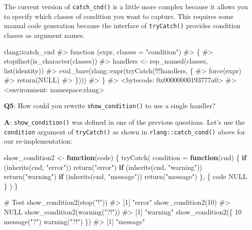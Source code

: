 \documentclass[
]{krantz}
\makeatletter
\newenvironment{Shaded}{\begin{snugshade}}{\end{snugshade}}
\newcommand{\CommentTok}[1]{\textcolor[rgb]{0.56,0.35,0.01}{\textit{#1}}}
\newcommand{\ControlFlowTok}[1]{\textcolor[rgb]{0.13,0.29,0.53}{\textbf{#1}}}
\newcommand{\DataTypeTok}[1]{\textcolor[rgb]{0.13,0.29,0.53}{#1}}
\newcommand{\DecValTok}[1]{\textcolor[rgb]{0.00,0.00,0.81}{#1}}
\newcommand{\KeywordTok}[1]{\textcolor[rgb]{0.13,0.29,0.53}{\textbf{#1}}}
\newcommand{\NormalTok}[1]{#1}
\newcommand{\OperatorTok}[1]{\textcolor[rgb]{0.81,0.36,0.00}{\textbf{#1}}}
\newcommand{\OtherTok}[1]{\textcolor[rgb]{0.56,0.35,0.01}{#1}}
\newcommand{\StringTok}[1]{\textcolor[rgb]{0.31,0.60,0.02}{#1}}
\newenvironment{kframe}{%
\medskip{}
\setlength{\fboxsep}{.8em}
 \def\at@end@of@kframe{}%
 \ifinner\ifhmode%
  \def\at@end@of@kframe{\end{minipage}}%
  \begin{minipage}{\columnwidth}%
 \fi\fi%
 \def\FrameCommand##1{\hskip\@totalleftmargin \hskip-\fboxsep
 \colorbox{shadecolor}{##1}\hskip-\fboxsep
     \hskip-\linewidth \hskip-\@totalleftmargin \hskip\columnwidth}%
 \MakeFramed {\advance\hsize-\width
   \@totalleftmargin\z@ \linewidth\hsize
   \@setminipage}}%
 {\par\unskip\endMakeFramed%
 \at@end@of@kframe}
\renewenvironment{Shaded}{\begin{kframe}}{\end{kframe}}
\renewcommand{\KeywordTok} [1]{\textcolor[rgb]{0.00,0.44,0.13}{{#1}}}
\renewcommand{\DataTypeTok}[1]{\textcolor[rgb]{0.56,0.13,0.00}{{#1}}}
\renewcommand{\DecValTok}  [1]{\textcolor[rgb]{0.25,0.63,0.44}{{#1}}}
\renewcommand{\StringTok}  [1]{\textcolor[rgb]{0.25,0.44,0.63}{{#1}}}
\renewcommand{\CommentTok} [1]{\textcolor[rgb]{0.38,0.63,0.69}{{#1}}}
\renewcommand{\OtherTok}   [1]{\textcolor[rgb]{0.00,0.44,0.13}{{#1}}}
\renewcommand{\NormalTok}  [1]{{#1}}
\makeatother
\begin{document}
The current version of \texttt{catch\_cnd()} is a little more complex because it allows you to specify which classes of condition you want to capture. This requires some manual code generation because the interface of \texttt{tryCatch()} provides condition classes as argument names.

\begin{Shaded}
\begin{Highlighting}[]
\NormalTok{rlang}\OperatorTok{::}\NormalTok{catch_cnd}
\CommentTok{#> function (expr, classes = "condition") }
\CommentTok{#> \{}
\CommentTok{#>     stopifnot(is_character(classes))}
\CommentTok{#>     handlers <- rep_named(classes, list(identity))}
\CommentTok{#>     eval_bare(rlang::expr(tryCatch(!!!handlers, \{}
\CommentTok{#>         force(expr)}
\CommentTok{#>         return(NULL)}
\CommentTok{#>     \})))}
\CommentTok{#> \}}
\CommentTok{#> <bytecode: 0x00000000193777a0>}
\CommentTok{#> <environment: namespace:rlang>}
\end{Highlighting}
\end{Shaded}

\textbf{{Q5}}: How could you rewrite \texttt{show\_condition()} to use a single handler?

\textbf{{A}}: \texttt{show\_condition()} was defined in one of the previous questions. Let's use the \texttt{condition} argument of \texttt{tryCatch()} as shown in \texttt{rlang::catch\_cond()} above for our re-implementation:

\begin{Shaded}
\begin{Highlighting}[]
\NormalTok{show_condition2 <-}\StringTok{ }\ControlFlowTok{function}\NormalTok{(code) \{}
  \KeywordTok{tryCatch}\NormalTok{(}
    \DataTypeTok{condition =} \ControlFlowTok{function}\NormalTok{(cnd) \{}
      \ControlFlowTok{if}\NormalTok{ (}\KeywordTok{inherits}\NormalTok{(cnd, }\StringTok{"error"}\NormalTok{))   }\KeywordTok{return}\NormalTok{(}\StringTok{"error"}\NormalTok{)}
      \ControlFlowTok{if}\NormalTok{ (}\KeywordTok{inherits}\NormalTok{(cnd, }\StringTok{"warning"}\NormalTok{)) }\KeywordTok{return}\NormalTok{(}\StringTok{"warning"}\NormalTok{)}
      \ControlFlowTok{if}\NormalTok{ (}\KeywordTok{inherits}\NormalTok{(cnd, }\StringTok{"message"}\NormalTok{)) }\KeywordTok{return}\NormalTok{(}\StringTok{"message"}\NormalTok{)}
\NormalTok{    \},}
\NormalTok{    \{}
\NormalTok{      code}
      \OtherTok{NULL}
\NormalTok{    \}}
\NormalTok{  )}
\NormalTok{\}}

\CommentTok{# Test}
\KeywordTok{show_condition2}\NormalTok{(}\KeywordTok{stop}\NormalTok{(}\StringTok{"!"}\NormalTok{))}
\CommentTok{#> [1] "error"}
\KeywordTok{show_condition2}\NormalTok{(}\DecValTok{10}\NormalTok{)}
\CommentTok{#> NULL}
\KeywordTok{show_condition2}\NormalTok{(}\KeywordTok{warning}\NormalTok{(}\StringTok{"?!"}\NormalTok{))}
\CommentTok{#> [1] "warning"}
\KeywordTok{show_condition2}\NormalTok{(\{}
  \DecValTok{10}
  \KeywordTok{message}\NormalTok{(}\StringTok{"?"}\NormalTok{)}
  \KeywordTok{warning}\NormalTok{(}\StringTok{"?!"}\NormalTok{)}
\NormalTok{\})}
\CommentTok{#> [1] "message"}
\end{Highlighting}
\end{Shaded}
\end{document}
